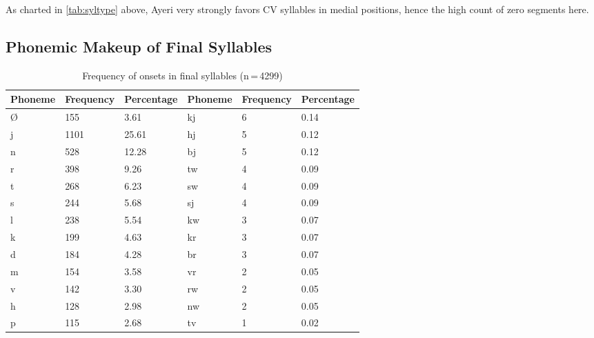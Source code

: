 As charted in \autoref{tab:syltype} above, Ayeri very strongly favors CV 
syllables in medial positions, hence the high count of zero segments here.

\subsection{Phonemic Makeup of Final Syllables}

\begin{table}[pth]\centering
\caption[Frequency of onsets in final syllables]{Frequency of onsets in final syllables (n\,=\,4299)}
\begin{tabu} to \textwidth{X X[c] X[c] X X[c] X[c]}
\tableheaderfont\toprule
Phoneme
	& Frequency
	& Percentage
	& Phoneme
	& Frequency
	& Percentage
	\\
	
\toprule

Ø
	& 155
	& 3.61\pct
	& kj
	& 6
	& 0.14\pct
	\\


j
	& 1101
	& 25.61\pct
	& hj
	& 5
	& 0.12\pct
	\\

n
	& 528
	& 12.28\pct
	& bj
	& 5
	& 0.12\pct
	\\

r
	& 398
	& 9.26\pct
	& tw
	& 4
	& 0.09\pct
	\\

t
	& 268
	& 6.23\pct
	& sw
	& 4
	& 0.09\pct
	\\

s
	& 244
	& 5.68\pct
	& sj
	& 4
	& 0.09\pct
	\\

l
	& 238
	& 5.54\pct
	& kw
	& 3
	& 0.07\pct
	\\

k
	& 199
	& 4.63\pct
	& kr
	& 3
	& 0.07\pct
	\\

d
	& 184
	& 4.28\pct
	& br
	& 3
	& 0.07\pct
	\\

m
	& 154
	& 3.58\pct
	& vr
	& 2
	& 0.05\pct
	\\

v
	& 142
	& 3.30\pct
	& rw
	& 2
	& 0.05\pct
	\\

h
	& 128
	& 2.98\pct
	& nw
	& 2
	& 0.05\pct
	\\

p
	& 115
	& 2.68\pct
	& tv
	& 1
	& 0.02\pct
	\\


\end{tabu}
\end{table}
